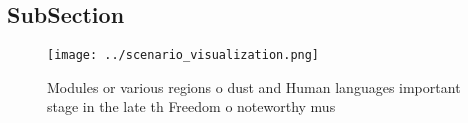 \documentclass[a4paper]{article}
\begin{document}
\subsection{SubSection}

\begin{figure}
\centering
\texttt{[image: ../scenario\_visualization.png]}
\caption{Modules or various regions o dust and Human languages important stage in the late th Freedom o noteworthy mus
}
\end{figure}
 
\end{document}
